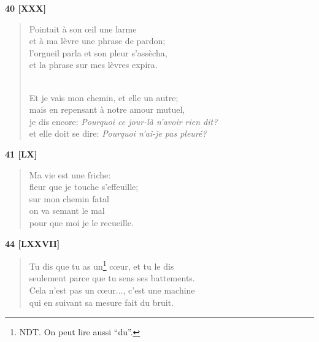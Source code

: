 \documentclass[a4paper,12pt]{book}
\begin{document}
\bigskip

\begin{center} {\bf 40 [XXX]} \end{center}

\begin{verse}
Pointait à son {\oe}il une larme \\
et à ma lèvre une phrase de pardon; \\
l'orgueil parla et son pleur s'assècha, \\
et la phrase sur mes lèvres expira. \\ \


Et je vais mon chemin, et elle un autre; \\
mais en repensant à notre amour mutuel, \\
je dis encore: {\em Pourquoi ce jour-là n'avoir rien dit?} \\
et elle doit se dire: {\em Pourquoi n'ai-je pas pleuré?} \\
\end{verse}

\bigskip

\begin{center} {\bf 41 [LX]} \end{center}

\begin{verse}
Ma vie est une friche: \\
fleur que je touche s'effeuille; \\
sur mon chemin fatal \\
on va semant le mal \\
pour que moi je le recueille. \\
\end{verse}

\bigskip

\begin{center} {\bf 44 [LXXVII]} \end{center}

\begin{verse}
Tu dis que tu as un\footnote{NDT. On peut lire aussi ``du''.} c{\oe}ur, et tu le dis \\
seulement parce que tu sens ses battements. \\
Cela n'est pas un c{\oe}ur..., c'est une machine \\
qui en suivant sa mesure fait du bruit. \\
\end{verse}
\end{document}
